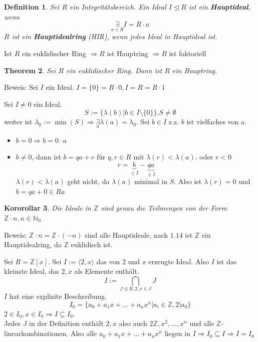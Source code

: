 \documentclass{article}
\newtheorem{thm}{Theorem}[section]
\newtheorem{defi}[thm]{Definition}
\newtheorem{korollar}[thm]{Kororollar}
\newcommand{\N}{\mathbb{N}}
\newcommand{\Z}{\mathbb{Z}}
\begin{document}
\color{black}
\begin{defi}
    Sei $R$ ein Integritätsbereich. Ein Ideal $I\unlhd R$
    ist ein \textbf{Hauptideal}, wenn
    \begin{equation*}
        \underset{a\in R}\exists I=R\cdot a
    \end{equation*}
    $R$ ist ein \textbf{Hauptidealring} (HIR), wenn jedes
    Ideal in Hauptideal ist.
\end{defi}
Ist $R$ ein euklidischer Ring $\Rightarrow R$ ist Hauptring
$\Rightarrow R$ ist faktoriell
\begin{thm}
    Sei $R$ ein euklidischer Ring. Dann ist $R$ ein
    Hauptring.
\end{thm}
Beweis:
Sei $I$ ein Ideal. $I=\{0\}=R\cdot 0, I=R=R\cdot 1$

Sei $I\neq 0$ ein Ideal.
\begin{equation*}
    S:=\{\lambda(b)|b\in I\setminus\{0\}\}.S\neq\emptyset
\end{equation*}
weiter ist $\lambda_0:=\min(S)\Rightarrow\underset{a}\exists
\lambda(a)=\lambda_0$. Sei $b\in I$ z.z. $b$ ist vielfaches
von $a$.
\begin{itemize}
    \item
        $b=0\Rightarrow b=0\cdot a$
    \item
        $b\neq 0$, dann ist $b=qa+r$ für $q,r\in R$ mit
        $\lambda(r)<\lambda(a).$ oder $r<0$
        \begin{equation*}
            r=\underbrace{b}_{\in I}-\underbrace{qa}_{\in I}
        \end{equation*}
        $\lambda(r)<\lambda(a)$ geht nicht, da $\lambda(a)$
        minimal in $S$. Also ist $\lambda(r)=0$ und
        $b=qa+0\in Ra$
\end{itemize}
\begin{korollar}
    Die Ideale in $\Z$ sind genau die Teilmengen von der
    Form $\Z\cdot n,n\in\N_0$
\end{korollar}
Beweis: $\Z\cdot n=\Z\cdot (-n)$ sind alle Hauptideale,
nach $1.14$ ist $\Z$ ein Hauptidealring, da $\Z$
euklidisch ist.

\color{purple}
Sei $R=\Z[x]$. Sei $I:=\langle2,x\rangle$ das von $2$ und
$x$ erzeugte Ideal. Also $I$ ist das kleinste Ideal, das
$2,x$ als Elemente enthält.
\begin{equation*}
    I:=\underset{J\unlhd R,2,x\in J}\bigcap J
\end{equation*}
$I$ hat eine explizite Beschreibung.
\begin{equation*}
    I_0=\{a_0+a_1x+\hdots+a_nx^n|a_i\in\Z,2|a_0\}
\end{equation*}
$2\in I_0,x\in I_0\Rightarrow I\subseteq I_0$.\\
Jedes $J$ in der Definition enthält $2,x$ also
auch $2\Z,x^2,\hdots,x^n$ und alle $\Z$-linearkombinationen,
Also alle $a_0+a_1x+\hdots+a_nx^n$ liegen in
$I\Rightarrow I_0\subseteq I\Rightarrow I=I_0$
\end{document}
